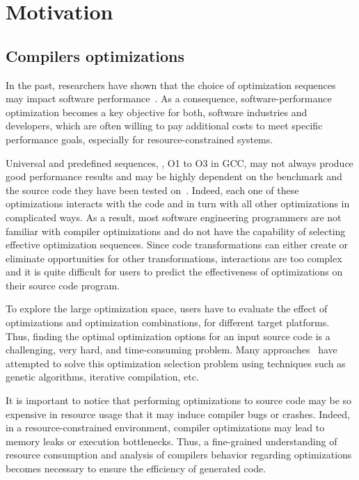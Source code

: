 \section{Motivation}
\subsection{Compilers optimizations}
In the past, researchers have shown that the choice of optimization sequences may impact software performance~\cite{almagor2004finding,chen2012deconstructing}. 
As a consequence, software-performance optimization becomes a key objective for both, software industries and developers, which are often willing to pay additional costs to meet specific performance goals, especially for resource-constrained systems.

Universal and predefined sequences, \eg, O1 to O3 in GCC, may not always produce good performance results and may be highly dependent on the benchmark and the source code they have been tested on~\cite{almagor2004finding,hoste2008cole}.
Indeed, each one of these optimizations interacts with the code and in turn with all other optimizations in complicated ways.
As a result, most software engineering programmers are not familiar with compiler optimizations and do not have the capability of selecting effective optimization sequences.
Since code transformations can either create or eliminate opportunities for other transformations, interactions are too complex and it is quite difficult for users to predict the effectiveness of optimizations on their source code program.

To explore the large optimization space, users have to evaluate the effect of optimizations and optimization combinations, for different target platforms. 
Thus, finding the optimal optimization options for an input source code is a challenging, very hard, and time-consuming problem. 
Many approaches~\cite{hoste2008cole,zhong2009tuning,sandran2012genetic,martins2014exploration} have attempted to solve this optimization selection problem using techniques such as genetic algorithms, iterative compilation, etc.

It is important to notice that performing optimizations to source code may be so expensive in resource usage that it may induce compiler bugs or crashes. 
Indeed, in a resource-constrained environment, compiler optimizations may lead to memory leaks or execution bottlenecks. 
Thus, a fine-grained understanding of resource consumption and analysis of compilers behavior regarding optimizations becomes necessary to ensure the efficiency of generated code.


